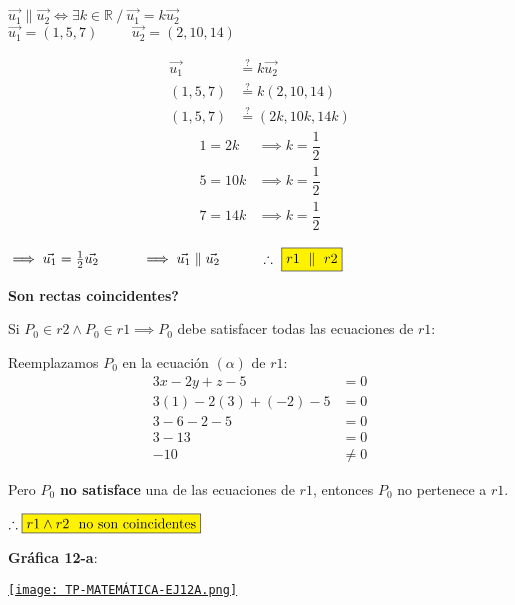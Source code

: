\begin{center}
	$\vec{u_1} \parallel \vec{u_2} \iff \exists k \in \mathbb{R} \ / \ \vec{u_1} = k\vec{u_2}$ \\
	\vspace{0.3cm}
	$\vec{u_1} = (1, 5, 7) \hspace{1cm} \vec{u_2} = (2, 10, 14)$
\end{center}

\begin{multicols}{2}
	\begin{align*}
		\vec{u_1} & \overset{?}{=} k\vec{u_2}     \\
		(1, 5, 7) & \overset{?}{=} k(2, 10, 14)   \\
		(1, 5, 7) & \overset{?}{=} (2k, 10k, 14k)
	\end{align*}
	\columnbreak
	\begin{align*}
		1 = 2k  & \implies k = \dfrac{1}{2} \\
		5 = 10k & \implies k = \dfrac{1}{2} \\
		7 = 14k & \implies k = \dfrac{1}{2}
	\end{align*}
\end{multicols}
\begin{center}
	$\implies \vec{u_1} = \frac{1}{2}\vec{u_2} \hspace{1cm} \implies \vec{u_1} \parallel \vec{u_2} \hspace{1cm} \therefore \ \fcolorbox{black}{yellow}{$r1 \ \parallel \ r2$}$
\end{center}

\vspace{1cm}
\noindent \textbf{Son rectas coincidentes?}

\noindent Si $P_0 \in r2 \land P_0 \in r1 \implies P_0$ debe satisfacer todas las ecuaciones de $r1$:

\noindent Reemplazamos $P_0$ en la ecuación $(\alpha)$ de $r1$:
\begin{align*}
	3x - 2y + z - 5        & = 0    \\
	3(1) - 2(3) + (-2) - 5 & = 0    \\
	3 - 6 -2 - 5           & = 0    \\
	3 - 13                 & = 0    \\
	-10                    & \neq 0
\end{align*}

\noindent Pero $P_0$ \textbf{no satisface} una de las ecuaciones de $r1$, entonces $P_0$ no pertenece a $r1$.
\begin{center}
	$\therefore \fcolorbox{black}{yellow}{$r1 \land r2 \ \ \text{no son coincidentes}$}$
\end{center}

\vspace{1cm}
\noindent \textbf{Gráfica 12-a}:
\begin{center}
	\href{https://www.geogebra.org/3d/yqkppcut}{\texttt{[image: TP-MATEMÁTICA-EJ12A.png]}}
\end{center}

